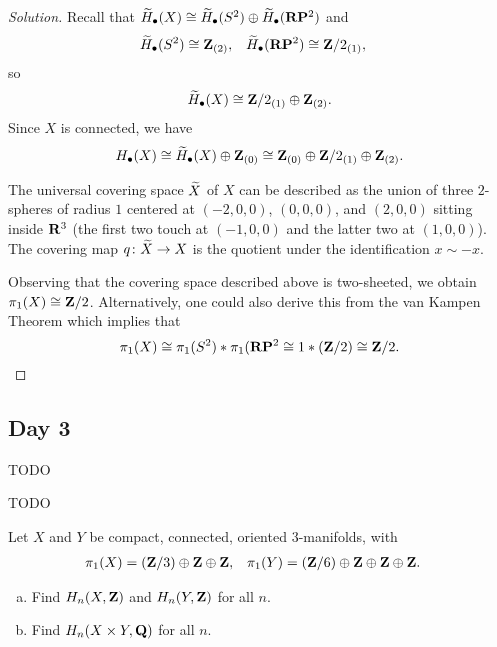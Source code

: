 \begin{proof}[Solution]
  Recall that $\widetilde{H}_\bullet(X) \cong \widetilde{H}_\bullet(S^2) \oplus \widetilde{H}_\bullet(\mathbf{R}\mathbf{P}^2)$ and
  \begin{align*}
    \widetilde{H}_\bullet(S^2)    &\cong \mathbf{Z}_{(2)}, &
    \widetilde{H}_\bullet(\mathbf{R}\mathbf{P}^2) &\cong \mathbf{Z}/2_{(1)},
  \end{align*}
  so
  \[
  \widetilde{H}_\bullet(X) \cong \mathbf{Z}/2_{(1)} \oplus \mathbf{Z}_{(2)}.
  \]
  Since $X$ is connected, we have
  \[
  H_\bullet(X) \cong
  \widetilde{H}_\bullet(X) \oplus \mathbf{Z}_{(0)} \cong
  \mathbf{Z}_{(0)} \oplus \mathbf{Z}/2_{(1)} \oplus \mathbf{Z}_{(2)}.
  \]
  
  The universal covering space $\widetilde{X}$ of $X$ can be described as the union of three $2$-spheres of radius $1$ centered at $(-2,0,0)$, $(0,0,0)$, and $(2,0,0)$ sitting inside $\mathbf{R}^3$ (the first two touch at $(-1,0,0)$ and the latter two at $(1,0,0)$). The covering map $q \colon \widetilde{X} \rightarrow X$ is the quotient under the identification $x \sim -x$.
  
  Observing that the covering space described above is two-sheeted, we obtain $\pi_1(X) \cong \mathbf{Z}/2$. Alternatively, one could also derive this from the van Kampen Theorem which implies that
  \[
  \pi_1(X) \cong
  \pi_1(S^2) \ast \pi_1(\mathbf{R}\mathbf{P}^2 \cong
  1 \ast (\mathbf{Z}/2) \cong
  \mathbf{Z}/2. \qedhere
  \]
\end{proof}

\subsection{Day 3}
\label{S:fall-2008-3}
\mbox{}


TODO


TODO


Let $X$ and $Y$ be compact, connected, oriented $3$-manifolds, with
\begin{align*}
  \pi_1(X) &= (\mathbf{Z}/3) \oplus \mathbf{Z} \oplus \mathbf{Z}, &
  \pi_1(Y) &= (\mathbf{Z}/6) \oplus \mathbf{Z} \oplus \mathbf{Z} \oplus \mathbf{Z}.
\end{align*}
\begin{enumerate}[(a)]
\item Find $H_n(X,\mathbf{Z})$ and $H_n(Y,\mathbf{Z})$ for all $n$.
\item Find $H_n(X \times Y, \mathbf{Q})$ for all $n$.
\end{enumerate}


